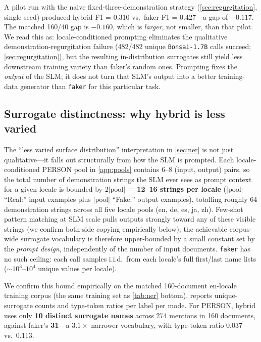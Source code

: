 \documentclass[11pt]{article}
\newcommand{\code}[1]{\texttt{#1}}
\newcommand{\bonsai}{\code{Bonsai-1.7B}}
\newcommand{\faker}{\code{faker}}
\begin{document}
A pilot run with the naive fixed-three-demonstration strategy
(\cref{sec:regurgitation}, single seed) produced hybrid F1 = 0.310 vs.\
faker F1 = 0.427---a gap of $-0.117$. The matched 160/40 gap is
$-0.160$, which is \emph{larger}, not smaller, than that pilot. We
read this as: locale-conditioned prompting eliminates the qualitative
demonstration-regurgitation failure (482/482 unique \bonsai{} calls
succeed; \cref{sec:regurgitation}), but the resulting in-distribution
surrogates still yield less downstream training variety than faker's
random ones. Prompting fixes the \emph{output} of the SLM; it does not
turn that SLM's output into a better training-data generator than
\faker{} for this particular task.

\subsection{Surrogate distinctness: why hybrid is less varied}
\label{sec:distinctness}

The ``less varied surface distribution'' interpretation in
\cref{sec:ner} is not just qualitative---it falls out structurally
from how the SLM is prompted. Each locale-conditioned PERSON pool in \cref{app:pools}
contains 6--8 (input, output) pairs, so the total number of
demonstration strings the SLM ever sees as prompt context for a
given locale is bounded by \textbf{$2|\text{pool}|$ = 12--16 strings
per locale} ($|\text{pool}|$ ``Real:'' input examples plus
$|\text{pool}|$ ``Fake:'' output examples), totalling roughly 64
demonstration strings across all five locale pools (en, de, es, ja,
zh). Few-shot pattern matching at SLM scale pulls outputs strongly
toward any of these visible strings (we confirm both-side copying
empirically below); the achievable corpus-wide surrogate vocabulary is
therefore upper-bounded by a small constant set by the \emph{prompt
design}, independently of the number of input documents. \faker{} has
no such ceiling: each call samples i.i.d.\ from each locale's full
first/last name lists ($\sim 10^{3}$--$10^{4}$ unique values per
locale).

We confirm this bound empirically on the matched 160-document en-locale
training corpus (the same training set as \cref{tab:ner} bottom).
\Cref{tab:distinctness} reports unique-surrogate counts and type-token
ratios per label per mode. For PERSON, hybrid uses only \textbf{10
distinct surrogate names} across 274 mentions in 160 documents, against
faker's \textbf{31}---a $3.1\times$ narrower vocabulary, with
type-token ratio 0.037 vs.\ 0.113.
\end{document}
